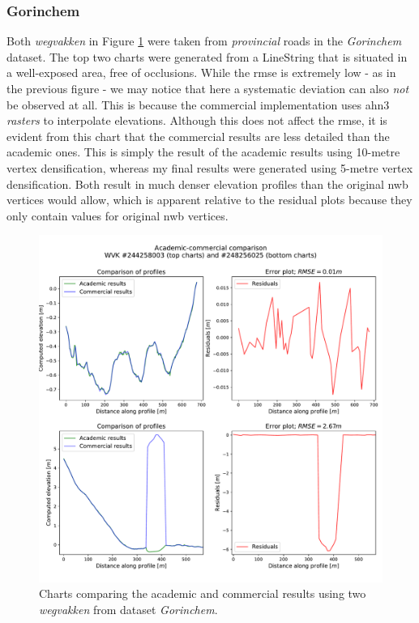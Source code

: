 \subsubsection{Gorinchem}

Both \textit{wegvakken} in Figure \ref{fig:commercialcomparison1} were taken from \textit{provincial} roads in the \textit{Gorinchem} dataset. The top two charts were generated from a LineString that is situated in a well-exposed area, free of occlusions. While the \ac{rmse} is extremely low - as in the previous figure - we may notice that here a systematic deviation can also \textit{not} be observed at all. This is because the commercial implementation uses \ac{ahn3} \textit{rasters} to interpolate elevations. Although this does not affect the \ac{rmse}, it is evident from this chart that the commercial results are less detailed than the academic ones. This is simply the result of the academic results using 10-metre vertex densification, whereas my final results were generated using 5-metre vertex densification. Both result in much denser elevation profiles than the original \ac{nwb} vertices would allow, which is apparent relative to the residual plots because they only contain values for original \ac{nwb} vertices.

\begin{figure}
    \centering
    \includegraphics[width=0.87\linewidth]{final_report/figs/commercialcomparison1.pdf}
    \caption[Charts comparing the academic and commercial results (\textit{Gorinchem})]{Charts comparing the academic and commercial results using two \textit{wegvakken} from dataset \textit{Gorinchem}.}
    \label{fig:commercialcomparison1}
\end{figure}

